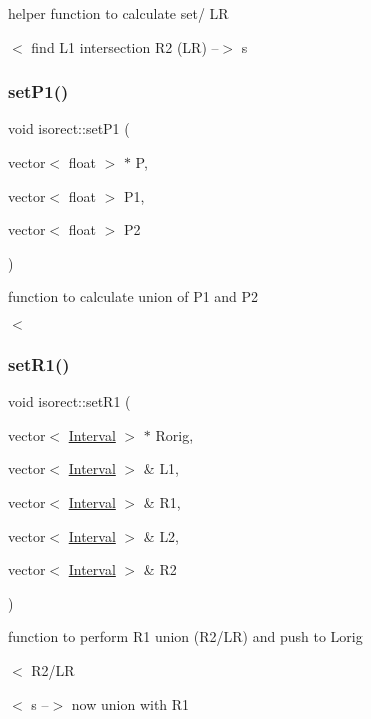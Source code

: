helper function to calculate set/ LR 

$<$ find L1 intersection R2 (LR) --$>$ s \mbox{\label{classisorect_af3fb03a32b2c833d32ed610f0b260071}} 
\subsubsection{\texorpdfstring{set\+P1()}{setP1()}}
{\footnotesize\ttfamily void isorect\+::set\+P1 (\begin{DoxyParamCaption}\item[{vector$<$ float $>$ $\ast$}]{P,  }\item[{vector$<$ float $>$}]{P1,  }\item[{vector$<$ float $>$}]{P2 }\end{DoxyParamCaption})}



function to calculate union of P1 and P2 

$<$ \mbox{\label{classisorect_af829250d2d043fde4d8356cb68076823}} 
\subsubsection{\texorpdfstring{set\+R1()}{setR1()}}
{\footnotesize\ttfamily void isorect\+::set\+R1 (\begin{DoxyParamCaption}\item[{vector$<$ \hyperlink{classInterval}{Interval} $>$ $\ast$}]{Rorig,  }\item[{vector$<$ \hyperlink{classInterval}{Interval} $>$ \&}]{L1,  }\item[{vector$<$ \hyperlink{classInterval}{Interval} $>$ \&}]{R1,  }\item[{vector$<$ \hyperlink{classInterval}{Interval} $>$ \&}]{L2,  }\item[{vector$<$ \hyperlink{classInterval}{Interval} $>$ \&}]{R2 }\end{DoxyParamCaption})}



function to perform R1 union (R2/\+LR) and push to Lorig 

$<$ R2/\+LR

$<$ s --$>$ now union with R1 \mbox{\label{classisorect_a74025c4207a4fe68b7a3e8be79d8c1cc}} 
